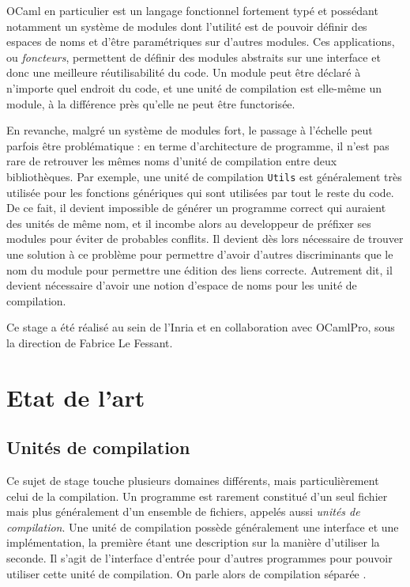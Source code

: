 \documentclass[11pt,a4paper]{report}
\begin{document}
OCaml en particulier est un langage fonctionnel fortement typé et possédant
notamment un système de modules dont l'utilité est de pouvoir définir des
espaces de noms et d'être paramétriques sur d'autres modules. Ces applications,
ou \emph{foncteurs}, permettent de définir des modules abstraits sur une
interface et donc une meilleure réutilisabilité du code. Un module peut être
déclaré à n'importe quel endroit du code, et une unité de compilation est
elle-même un module, à la différence près qu'elle ne peut être functorisée.

En revanche, malgré un système de modules fort, le passage à l'échelle peut
parfois être problématique : en terme d'architecture de programme, il n'est pas
rare de retrouver les mêmes noms d'unité de compilation entre deux
bibliothèques. Par exemple, une unité de compilation \texttt{Utils} est
généralement très utilisée pour les fonctions génériques qui sont utilisées par
tout le reste du code. De ce fait, il devient impossible de générer un programme
correct qui auraient des unités de même nom, et il incombe alors au developpeur
de préfixer ses modules pour éviter de probables conflits. Il devient dès lors
nécessaire de trouver une solution à ce problème pour permettre d'avoir d'autres
discriminants que le nom du module pour permettre une édition des liens
correcte. Autrement dit, il devient nécessaire d'avoir une notion d'espace de
noms pour les unité de compilation.

Ce stage a été réalisé au sein de l'Inria et en collaboration avec OCamlPro,
sous la direction de Fabrice Le Fessant.

\chapter{Etat de l'art}

\section{Unités de compilation}

Ce sujet de stage touche plusieurs domaines différents, mais particulièrement
celui de la compilation. Un programme est rarement constitué d'un seul fichier
mais plus généralement d'un ensemble de fichiers, appelés aussi \emph{unités de
  compilation}. Une unité de compilation possède généralement une interface et
une implémentation, la première étant une description sur la manière d'utiliser
la seconde. Il s'agit de l'interface d'entrée pour d'autres programmes pour
pouvoir utiliser cette unité de compilation. On parle alors de compilation
séparée \cite{Cardelli97programfragments}. 
\end{document}
